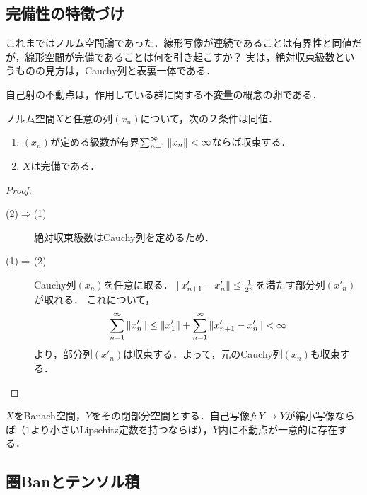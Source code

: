 \documentclass[uplatex,dvipdfmx]{jsreport}
\begin{document}
\subsection{完備性の特徴づけ}

\begin{tcolorbox}[colframe=ForestGreen, colback=ForestGreen!10!white,breakable,colbacktitle=ForestGreen!40!white,coltitle=black,fonttitle=\bfseries\sffamily,
title=]
    これまではノルム空間論であった．線形写像が連続であることは有界性と同値だが，線形空間が完備であることは何を引き起こすか？
    実は，絶対収束級数というものの見方は，Cauchy列と表裏一体である．

    自己射の不動点は，作用している群に関する不変量の概念の卵である．
\end{tcolorbox}

\begin{theorem}[絶対収束級数なるクラスの定義]
    ノルム空間$X$と任意の列$(x_n)$について，次の２条件は同値．
    \begin{enumerate}
        \item $(x_n)$が定める級数が有界$\sum^\infty_{n=1}\|x_n\|<\infty$ならば収束する．
        \item $X$は完備である．
    \end{enumerate}
\end{theorem}
\begin{proof}\mbox{}
    \begin{description}
        \item[(2)$\Rightarrow$(1)] 絶対収束級数はCauchy列を定めるため．
        \item[(1)$\Rightarrow$(2)] Cauchy列$(x_n)$を任意に取る．
        $\|x'_{n+1}-x'_n\|\le\frac{1}{2^n}$を満たす部分列$(x'_n)$が取れる．
        これについて，
        \[\sum_{n=1}^\infty\|x'_n\|\le\|x'_1\|+\sum_{n=1}^\infty\|x'_{n+1}-x'_n\|<\infty\]
        より，部分列$(x'_n)$は収束する．よって，元のCauchy列$(x_n)$も収束する．
    \end{description}
\end{proof}

\begin{theorem}
    $X$をBanach空間，$Y$をその閉部分空間とする．自己写像$f:Y\to Y$が縮小写像ならば（$1$より小さいLipschitz定数を持つならば），$Y$内に不動点が一意的に存在する．
\end{theorem}

\subsection{圏Banとテンソル積}
\end{document}
